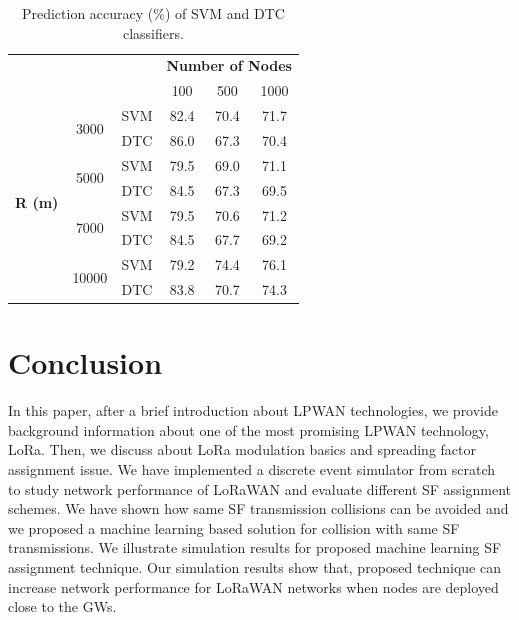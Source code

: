 \documentclass[conference]{IEEEtran}
\begin{document}
\begin{table}
\centering
\caption{Prediction accuracy (\%) of SVM and DTC classifiers.}
\label{table:prediction_accuracy}
\begin{tabular}{|c|c|c|c|c|c|}
\hline
\multicolumn{3}{|c|}{\multirow{2}{*}{}}                        & \multicolumn{3}{c|}{\textbf{Number of Nodes}} \\ \cline{4-6}
\multicolumn{3}{|c|}{}                                         & 100           & 500           & 1000          \\ \hline
\multirow{8}{*}{\textbf{R (m)}} & \multirow{2}{*}{3000}  & SVM & 82.4          & 70.4          & 71.7          \\ \cline{3-6}
                                &                        & DTC & 86.0          & 67.3          & 70.4          \\ \cline{2-6}

                                & \multirow{2}{*}{5000}  & SVM & 79.5          & 69.0          & 71.1          \\ \cline{3-6}
                                &                        & DTC & 84.5          & 67.3          & 69.5          \\ \cline{2-6}

                                & \multirow{2}{*}{7000}  & SVM & 79.5          & 70.6          & 71.2          \\ \cline{3-6}
                                &                        & DTC & 84.5          & 67.7          & 69.2          \\ \cline{2-6}

                                & \multirow{2}{*}{10000} & SVM & 79.2          & 74.4          & 76.1          \\ \cline{3-6}
                                &                        & DTC & 83.8          & 70.7          & 74.3          \\ \hline
\end{tabular}
\end{table}

\section{Conclusion} \label{Conclusion}
\par In this paper, after a brief introduction about LPWAN technologies, we provide background information about one of the most promising LPWAN technology, LoRa. Then, we discuss about LoRa modulation basics and spreading factor assignment issue. We have implemented a discrete event simulator from scratch to study network performance of LoRaWAN and evaluate different SF assignment schemes. We have shown how same SF transmission collisions can be avoided and we proposed a machine learning based solution for collision with same SF transmissions. We illustrate simulation results for proposed machine learning SF assignment technique. Our simulation results show that, proposed technique can increase network performance for LoRaWAN networks when nodes are deployed close to the GWs.
\end{document}
